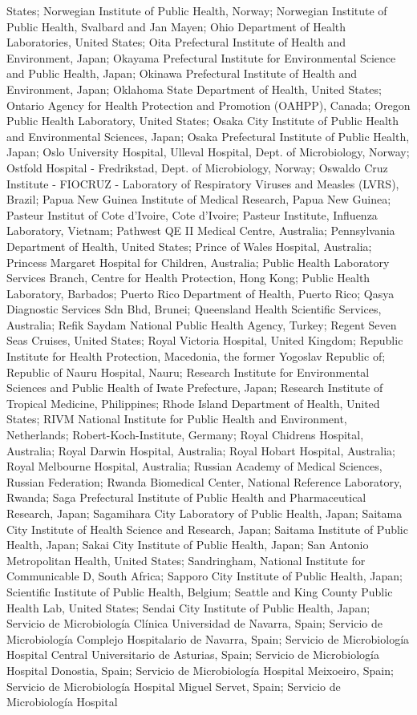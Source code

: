 States; Norwegian Institute of Public Health, Norway; Norwegian Institute of Public Health, Svalbard and Jan Mayen; Ohio Department of Health Laboratories, United States; Oita Prefectural Institute of Health and Environment, Japan; Okayama Prefectural Institute for Environmental Science and Public Health, Japan; Okinawa Prefectural Institute of Health and Environment, Japan; Oklahoma State Department of Health, United States; Ontario Agency for Health Protection and Promotion (OAHPP), Canada; Oregon Public Health Laboratory, United States; Osaka City Institute of Public Health and Environmental Sciences, Japan; Osaka Prefectural Institute of Public Health, Japan; Oslo University Hospital, Ulleval Hospital, Dept. of Microbiology, Norway; Ostfold Hospital - Fredrikstad, Dept. of Microbiology, Norway; Oswaldo Cruz Institute - FIOCRUZ - Laboratory of Respiratory Viruses and Measles (LVRS), Brazil; Papua New Guinea Institute of Medical Research, Papua New Guinea; Pasteur Institut of Cote d'Ivoire, Cote d'Ivoire; Pasteur Institute, Influenza Laboratory, Vietnam; Pathwest QE II Medical Centre, Australia; Pennsylvania Department of Health, United States; Prince of Wales Hospital, Australia; Princess Margaret Hospital for Children, Australia; Public Health Laboratory Services Branch, Centre for Health Protection, Hong Kong; Public Health Laboratory, Barbados; Puerto Rico Department of Health, Puerto Rico; Qasya Diagnostic Services Sdn Bhd, Brunei; Queensland Health Scientific Services, Australia; Refik Saydam National Public Health Agency, Turkey; Regent Seven Seas Cruises, United States; Royal Victoria Hospital, United Kingdom; Republic Institute for Health Protection, Macedonia, the former Yogoslav Republic of; Republic of Nauru Hospital, Nauru; Research Institute for Environmental Sciences and Public Health of Iwate Prefecture, Japan; Research Institute of Tropical Medicine, Philippines; Rhode Island Department of Health, United States; RIVM National Institute for Public Health and Environment, Netherlands; Robert-Koch-Institute, Germany; Royal Chidrens Hospital, Australia; Royal Darwin Hospital, Australia; Royal Hobart Hospital, Australia; Royal Melbourne Hospital, Australia; Russian Academy of Medical Sciences, Russian Federation; Rwanda Biomedical Center, National Reference Laboratory, Rwanda; Saga Prefectural Institute of Public Health and Pharmaceutical Research, Japan; Sagamihara City Laboratory of Public Health, Japan; Saitama City Institute of Health Science and Research, Japan; Saitama Institute of Public Health, Japan; Sakai City Institute of Public Health, Japan; San Antonio Metropolitan Health, United States; Sandringham, National Institute for Communicable D, South Africa; Sapporo City Institute of Public Health, Japan; Scientific Institute of Public Health, Belgium; Seattle and King County Public Health Lab, United States; Sendai City Institute of Public Health, Japan; Servicio de Microbiología Clínica Universidad de Navarra, Spain; Servicio de Microbiología Complejo Hospitalario de Navarra, Spain; Servicio de Microbiología Hospital Central Universitario de Asturias, Spain; Servicio de Microbiología Hospital Donostia, Spain; Servicio de Microbiología Hospital Meixoeiro, Spain; Servicio de Microbiología Hospital Miguel Servet, Spain; Servicio de Microbiología Hospital 
